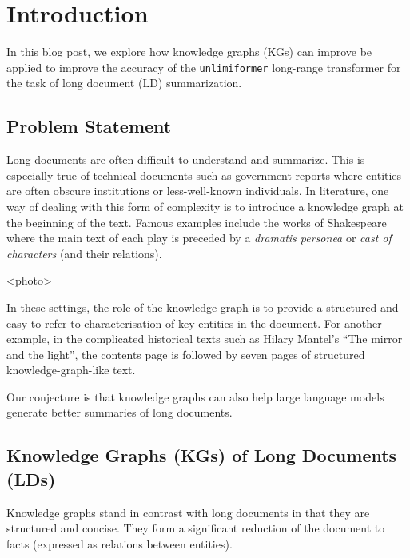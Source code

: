 \documentclass[12pt]{article}
\begin{document}
\section*{Introduction}
In this blog post, we explore how knowledge graphs (KGs) can improve be applied to
improve the accuracy of the \texttt{unlimiformer} long-range transformer for
the task of long document (LD) summarization.

\subsection*{Problem Statement}

Long documents are often difficult to understand and summarize. This is
especially true of technical documents such as government reports where
entities are often obscure institutions or less-well-known individuals. In
literature, one way of dealing with this form of complexity is to introduce a
knowledge graph at the beginning of the text. Famous examples include the works
of Shakespeare where the main text of each play is preceded by  a
\emph{dramatis personea} or \emph{cast of characters} (and their relations).

<photo>

In these settings, the role of the knowledge graph is to provide a structured and
easy-to-refer-to characterisation of key entities in the document. For another
example, in the complicated historical texts such as Hilary Mantel's ``The
mirror and the light'', the contents page is followed by seven pages of
structured knowledge-graph-like text.

Our conjecture is that knowledge graphs can also help large language models
generate better summaries of long documents.

\subsection*{Knowledge Graphs (KGs) of Long Documents (LDs)}

Knowledge graphs stand in contrast with long documents in that they are
structured and concise. They form a significant reduction of the document to
facts (expressed as relations between entities).

\end{document}
